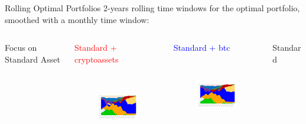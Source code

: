 \documentclass[aspectratio=169]{beamer}
\newcommand\Fontvi{\fontsize{8}{7.2}\selectfont}
\newcommand\Fontci{\fontsize{7}{7.2}\selectfont}
\begin{document}
\begin{frame}[noframenumbering]{Rolling Optimal Portfolios}
2-years rolling time windows for the optimal portfolio, smoothed with a monthly time window:
	\begin{columns}
		\begin{column}{0.1\textwidth}
		    \bigskip
		    \bigskip
		    
            \Fontci{}Focus on Standard Asset
		\end{column}
		\begin{column}{0.3\textwidth}  
		    \begin{center}
            \Fontvi{}\textcolor{red}{Standard + cryptoassets}
            \end{center}
            \begin{figure}
                \centering
                \includegraphics[width=4cm, height=3cm]{Images/rolling_allocation/rollstall.png}
            \end{figure}
		\end{column}
		\begin{column}{0.3\textwidth}  
		    \begin{center}
            \Fontvi{}\textcolor{blue}{Standard + btc}
            \end{center}
            \begin{figure}
                \centering
                \includegraphics[width=4cm, height=3cm]{Images/rolling_allocation/rollstbtc.png}
            \end{figure}
		\end{column}
    	\begin{column}{0.3\textwidth} 
    	    \begin{center}
            \Fontvi{}Standard
            \end{center}
            \begin{figure}

\end{figure}
\end{column}
\end{columns}
\end{frame}
\end{document}

